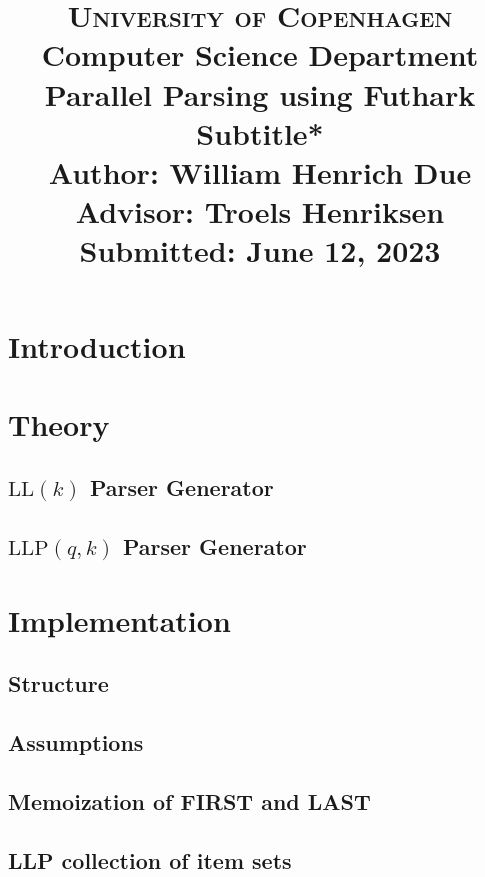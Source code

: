 \documentclass[a4paper,12pt]{article}
\title{
    {\Large \textsc{University of Copenhagen}} \\[0pt]
    {\large Computer Science Department} \\[10pt]
    {\Large Parallel Parsing using Futhark} \\[0pt]
    {\large *Subtitle*} \\[10pt]
    Author: William Henrich Due \\[0pt]
    Advisor: Troels Henriksen \\[0pt]
    Submitted: June 12, 2023
}
\author{}
\date{}
\newcommand\LL{\text{LL}}
\newcommand\LLP{\text{LLP}}
\theoremstyle{definition}
\begin{document}
\maketitle
\thispagestyle{firstpage}
\tableofcontents


\section{Introduction}


\section{Theory}

\subsection{\texorpdfstring{$\LL(k)$}{TEXT} Parser Generator}


\subsection{\texorpdfstring{$\LLP(q,k)$}{TEXT} Parser Generator}



\section{Implementation}

\subsection{Structure}


\subsection{Assumptions}


\subsection{Memoization of FIRST and LAST}


\subsection{LLP collection of item sets}

\end{document}
